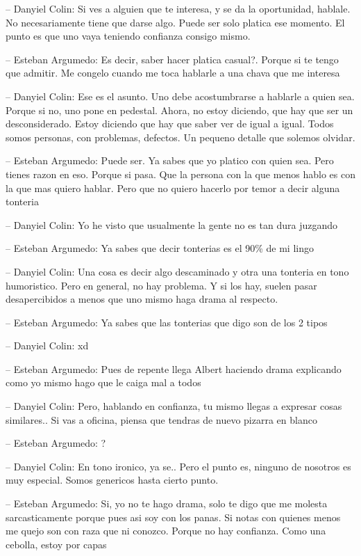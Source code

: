 -- Danyiel Colin: Si ves a alguien que te interesa, y se da la
oportunidad, hablale. No necesariamente tiene que darse algo. Puede ser
solo platica ese momento. El punto es que uno vaya teniendo confianza
consigo mismo.

-- Esteban Argumedo: Es decir, saber hacer platica casual?. Porque si te
tengo que admitir. Me congelo cuando me toca hablarle a una chava que me
interesa

-- Danyiel Colin: Ese es el asunto. Uno debe acostumbrarse a hablarle a
quien sea. Porque si no, uno pone en pedestal. Ahora, no estoy diciendo,
que hay que ser un desconsiderado. Estoy diciendo que hay que saber ver
de igual a igual. Todos somos personas, con problemas, defectos. Un
pequeno detalle que solemos olvidar.

-- Esteban Argumedo: Puede ser. Ya sabes que yo platico con quien sea.
Pero tienes razon en eso. Porque si pasa. Que la persona con la que
menos hablo es con la que mas quiero hablar. Pero que no quiero hacerlo
por temor a decir alguna tonteria

-- Danyiel Colin: Yo he visto que usualmente la gente no es tan dura
juzgando

-- Esteban Argumedo: Ya sabes que decir tonterias es el 90\% de mi lingo

-- Danyiel Colin: Una cosa es decir algo descaminado y otra una tonteria
en tono humoristico. Pero en general, no hay problema. Y si los hay,
suelen pasar desapercibidos a menos que uno mismo haga drama al
respecto.

-- Esteban Argumedo: Ya sabes que las tonterias que digo son de los 2
tipos

-- Danyiel Colin: xd

-- Esteban Argumedo: Pues de repente llega Albert haciendo drama
explicando como yo mismo hago que le caiga mal a todos

-- Danyiel Colin: Pero, hablando en confianza, tu mismo llegas a
expresar cosas similares.. Si vas a oficina, piensa que tendras de nuevo
pizarra en blanco

-- Esteban Argumedo: ?

-- Danyiel Colin: En tono ironico, ya se.. Pero el punto es, ninguno de
nosotros es muy especial. Somos genericos hasta cierto punto.

-- Esteban Argumedo: Si, yo no te hago drama, solo te digo que me
molesta sarcasticamente porque pues asi soy con los panas. Si notas con
quienes menos me quejo son con raza que ni conozco. Porque no hay
confianza. Como una cebolla, estoy por capas

